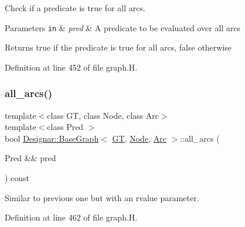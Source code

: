 Check if a predicate is true for all arcs. 


\begin{DoxyParams}[1]{Parameters}
\mbox{\tt in}  & {\em pred} & A predicate to be evaluated over all arcs \\
\hline
\end{DoxyParams}
\begin{DoxyReturn}{Returns}
{\ttfamily true} if the predicate is true for all arcs, {\ttfamily false} otherwise 
\end{DoxyReturn}


Definition at line 452 of file graph.\+H.

\mbox{\label{class_designar_1_1_base_graph_aea71a873faf7e92195d582b21d14c347}} 
\subsubsection{\texorpdfstring{all\+\_\+arcs()}{all\_arcs()}\hspace{0.1cm}{\footnotesize\ttfamily [2/2]}}
{\footnotesize\ttfamily template$<$class GT, class Node, class Arc$>$ \\
template$<$class Pred $>$ \\
bool \hyperlink{class_designar_1_1_base_graph}{Designar\+::\+Base\+Graph}$<$ \hyperlink{demo-buildgraph_8_c_a3001c40d2c31ca87ed96cd7d1334a55e}{GT}, \hyperlink{namespace_designar_a5af326c65aa2bd26b26c410f2030d09e}{Node}, \hyperlink{namespace_designar_a3f55fb5513d62ff47cbc8f72b8e95d6f}{Arc} $>$\+::all\+\_\+arcs (\begin{DoxyParamCaption}\item[{Pred \&\&}]{pred }\end{DoxyParamCaption}) const\hspace{0.3cm}{\ttfamily [inline]}}



Similar to previous one but with an rvalue parameter. 



Definition at line 462 of file graph.\+H.

\mbox{\label{class_designar_1_1_base_graph_abad9513273c1096aba652e211180061c}} 
